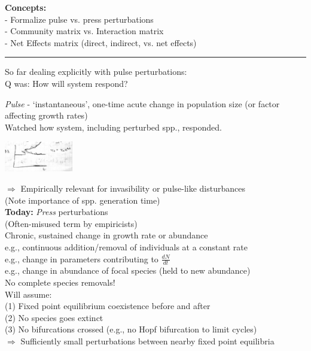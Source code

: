 \documentclass{article}
\newcommand{\ind}{\-\hspace{1cm}}
\begin{document}
\noindent{}

\textbf{Concepts:}\\
\ind - Formalize pulse vs. press perturbations\\
\ind - Community matrix vs. Interaction matrix\\
\ind - Net Effects matrix (direct, indirect, vs. net effects)

\rule[0.5ex]{\linewidth}{1pt}
So far dealing explicitly with pulse perturbations:\\
\ind Q was: How will system respond?

\ind \emph{Pulse} - `instantaneous', one-time acute change in population size (or factor affecting growth rates)\\
\ind\ind Watched how system, including perturbed spp., responded.
\begin{center}
 	\includegraphics[width=3cm]{figs/Pulse.pdf}
\end{center}
\ind \ind $\Rightarrow$ Empirically relevant for invasibility or pulse-like disturbances\\
\ind \ind \ind (Note importance of spp. generation time)\\

\textbf{Today:}  \emph{Press} perturbations\\
\ind (Often-misused term by empiricists)\\
\ind \ind Chronic, sustained change in growth rate or abundance\\
\ind \ind \ind e.g., continuous addition/removal of individuals at a constant rate\\
\ind \ind \ind e.g., change in parameters contributing to $\frac{dN}{dt}$\\
\ind \ind \ind e.g., change in abundance of focal species (held to new abundance)\\
\ind \ind No complete species removals!\\

\ind Will assume: \\
\ind \ind (1) Fixed point equilibrium coexistence before and after\\
\ind \ind (2) No species goes extinct\\
\ind \ind (3) No bifurcations crossed (e.g., no Hopf bifurcation to limit cycles)\\
\ind  \ind $\Rightarrow$ Sufficiently small perturbations between nearby fixed point equilibria
\end{document}

